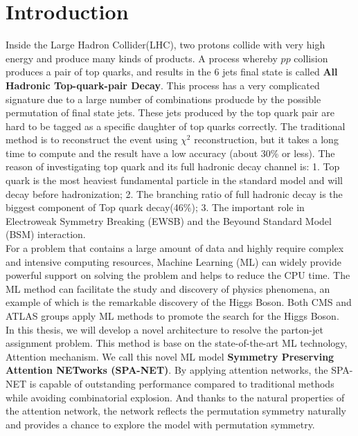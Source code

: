 
\chapter{Introduction} 

\newcommand{\comment}[1]{}

Inside the Large Hadron Collider(LHC), two protons collide with very high energy and produce many kinds of products. A process whereby $pp$ collision produces a pair of top quarks, and results in the 6 jets final state is called \textbf{All Hadronic Top-quark-pair Decay}. This process has a very complicated signature due to a large number of combinations producde by the possible permutation of final state jets. These jets produced by the top quark pair are hard to be tagged as a specific daughter of top quarks correctly. The traditional method is to reconstruct the event using $\chi^{2}$ reconstruction, but it takes a long time to compute and the result have a low accuracy (about 30\% or less). The reason of investigating top quark and its full hadronic decay channel is: 1. Top quark is the most heaviest  fundamental particle in the standard model and will decay before hadronization; 2. The branching ratio of full hadronic decay is the biggest component of Top quark decay(46\%); 3. The important role in Electroweak Symmetry Breaking (EWSB) and the Beyound Standard Model (BSM) interaction.
\\
For a problem that contains a large amount of data and highly require complex and intensive computing resources, Machine Learning (ML) can widely provide powerful support on solving the problem and helps to reduce the CPU time. The ML method can facilitate the study and discovery of physics phenomena, an example of which is the remarkable discovery of the Higgs Boson. Both CMS and ATLAS groups apply ML methods to promote the search for the Higgs Boson. \cite{Aad:2012tfa}\cite{Chatrchyan:2012ufa}
\\ 
In this thesis, we will develop a novel architecture to resolve the parton-jet assignment problem. This method is base on the state-of-the-art ML technology, Attention mechanism.\cite{A.Vaswani:2017} We call this novel ML model \textbf{Symmetry Preserving Attention NETworks (SPA-NET)}. By applying attention networks, the SPA-NET is capable of outstanding performance compared to traditional methods while avoiding combinatorial explosion. And thanks to the natural properties of the attention network, the network reflects the permutation symmetry naturally and provides a chance to explore the model with permutation symmetry. 
